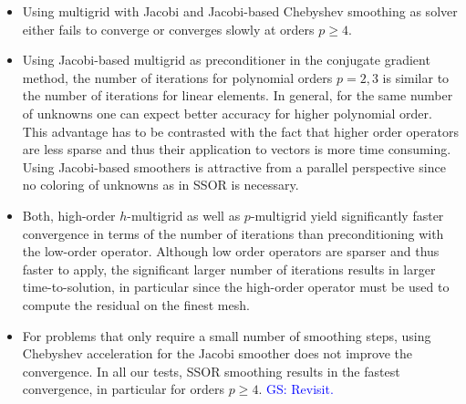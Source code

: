 \documentclass[smallcondensed,final]{svjour3}     %
\newcommand{\gsnote}[1]{\textcolor{blue}{GS: #1}}
\begin{document}
\begin{itemize}
\item Using multigrid with Jacobi and Jacobi-based Chebyshev smoothing
  as solver either fails to converge or converges slowly at orders
  $p\ge 4$.
\item Using Jacobi-based multigrid as preconditioner in the conjugate
  gradient method, the number of iterations for polynomial orders
  $p=2,3$ is similar to the number of iterations for linear elements.
  In general, for the same number of unknowns one can expect better
  accuracy for higher polynomial order. This advantage has to be
  contrasted with the fact that higher order operators are less sparse
  and thus their application to vectors is more time consuming.  Using
  Jacobi-based smoothers is attractive from a parallel perspective
  since no coloring of unknowns as in SSOR is necessary.
\item Both, high-order $h$-multigrid as well as $p$-multigrid yield
  significantly faster convergence in terms of the number of
  iterations than preconditioning with the low-order
  operator. Although low order operators are sparser and thus faster
  to apply, the significant larger number of iterations results in
  larger time-to-solution, in particular since the high-order operator
  must be used to compute the residual on the finest mesh.
\item For problems that only require a small number of smoothing
  steps, using Chebyshev acceleration for the Jacobi smoother does not
  improve the convergence. In all our tests, SSOR smoothing results in
  the fastest convergence, in particular for orders $p\ge
  4$. \gsnote{Revisit.}
\end{itemize}




\end{document}
